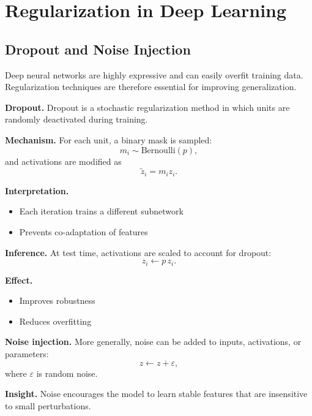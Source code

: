 \chapter{Regularization in Deep Learning}

\section{Dropout and Noise Injection}

Deep neural networks are highly expressive and can easily overfit training data. Regularization techniques are therefore essential for improving generalization.

\medskip

\noindent
\textbf{Dropout.}  
Dropout is a stochastic regularization method in which units are randomly deactivated during training.

\medskip

\noindent
\textbf{Mechanism.}  
For each unit, a binary mask is sampled:
\[
m_i \sim \text{Bernoulli}(p),
\]
and activations are modified as
\[
\tilde{z}_i = m_i z_i.
\]

\medskip

\noindent
\textbf{Interpretation.}
\begin{itemize}
    \item Each iteration trains a different subnetwork
    \item Prevents co-adaptation of features
\end{itemize}

\medskip

\noindent
\textbf{Inference.}  
At test time, activations are scaled to account for dropout:
\[
z_i \leftarrow p \, z_i.
\]

\medskip

\noindent
\textbf{Effect.}
\begin{itemize}
    \item Improves robustness
    \item Reduces overfitting
\end{itemize}

\medskip

\noindent
\textbf{Noise injection.}  
More generally, noise can be added to inputs, activations, or parameters:
\[
z \leftarrow z + \varepsilon,
\]
where $\varepsilon$ is random noise.

\medskip

\noindent
\textbf{Insight.}  
Noise encourages the model to learn stable features that are insensitive to small perturbations.

